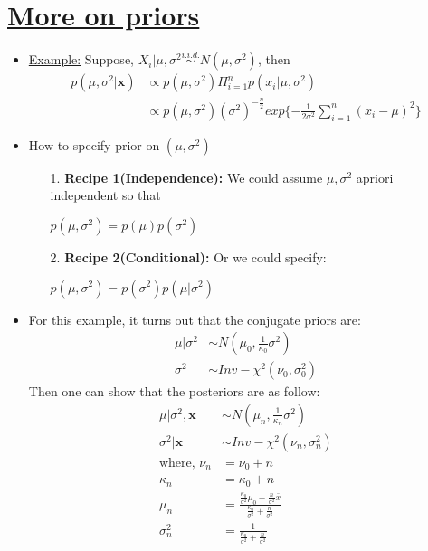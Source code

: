 \documentclass[12pt]{article}
\begin{document}
\section{\underline{More on priors}}
\begin{itemize}
\item \underline{Example:} Suppose, $X_i|\mu, \sigma^{2} \stackrel{i.i.d.}{\sim} N(\mu, \sigma^{2})$, then
\begin{align*}
p(\mu, \sigma^{2}| \mathbf{x}) &\propto p(\mu, \sigma^{2}) \Pi_{i=1}^{n} p(x_i|\mu, \sigma^{2}) \\
        & \propto p(\mu, \sigma^{2})(\sigma^2)^{-\frac{n}{2}}exp\{-\frac{1}{2\sigma^2} \sum_{i=1}^{n}(x_i - \mu)^2\}
\end{align*}
\item How to specify prior on $(\mu, \sigma^{2})$
\begin{enumerate}
\item[1.] \textbf{Recipe 1(Independence):} We could assume $\mu, \sigma^{2}$ apriori independent so that
\begin{center}
$p(\mu, \sigma^{2}) = p(\mu) p(\sigma^{2})$
\end{center}
\item[2.] \textbf{Recipe 2(Conditional):} Or we could specify: 
\begin{center}
$p(\mu, \sigma^{2}) = p(\sigma^{2}) p(\mu|\sigma^{2}) $
\end{center}
\end{enumerate}
\item For this example, it turns out that the conjugate priors are:
\begin{align*}
\mu|\sigma^2 &\sim N(\mu_0, \frac{1}{\kappa_0}\sigma^2) \\
\sigma^2 &\sim Inv-\chi^2(\nu_0, \sigma_0^2) 
\end{align*}
Then one can show that the posteriors are as follow:
\begin{align*}
\mu|\sigma^2, \mathbf{x} &\sim N(\mu_n, \frac{1}{\kappa_n}\sigma^2) \\
\sigma^2| \mathbf{x} &\sim Inv-\chi^2(\nu_n, \sigma_n^2) \\
\text{where, } \nu_n &= \nu_0 + n \\
\kappa_n &= \kappa_0 + n\\
\mu_n &= \frac{\frac{\kappa_0}{\sigma^2}\mu_0 + \frac{n}{\sigma^2}\bar{x} } {\frac{\kappa_0}{\sigma^2} + \frac{n}{\sigma^2} } \\
\sigma_n^2 &= \frac{1}  {\frac{\kappa_0}{\sigma^2} + \frac{n}{\sigma^2} }

\end{align*}
\end{itemize}
\end{document}
